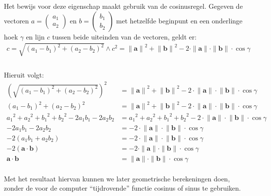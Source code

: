 \documentclass[12pt,a4paper]{article}
\begin{document}
	Het bewijs voor deze eigenschap maakt gebruik van de cosinusregel. Gegeven de vectoren $a=\begin{pmatrix} a_1 \\ a_2 \end{pmatrix}$ en $b=\begin{pmatrix} b_1 \\ b_2 \end{pmatrix}$ met hetzelfde beginpunt en een onderlinge hoek $\gamma$ en lijn $c$ tussen beide uiteinden van de vectoren, geldt er:
 	\begin{equation}
		\begin{aligned}
			c=\sqrt{(a_1-b_1)^2+(a_2-b_2)^2} \wedge c^2={\|\mathbf{a}\|}^2 + {\|\mathbf{b}\|}^2 - 2 \cdot \|\mathbf{a}\| \cdot \|\mathbf{b}\| \cdot \cos\gamma \\
		\end{aligned}
	\end{equation}
	\\Hieruit volgt:
	\begin{equation}
		\label{inproduct-cosinus}
		\begin{aligned}
			\left(\sqrt{(a_1-b_1)^2 + (a_2-b_2)^2}\right)^2 &= {\|\mathbf{a}\|}^2 + {\|\mathbf{b}\|}^2 - 2 \cdot {\|\mathbf{a}\|} \cdot {\|\mathbf{b}\|} \cdot \cos\gamma \\
			(a_1-b_1)^2 + (a_2-b_2)^2 &= {\|\mathbf{a}\|}^2 + {\|\mathbf{b}\|}^2 - 2 \cdot {\|\mathbf{a}\|} \cdot {\|\mathbf{b}\|} \cdot \cos\gamma \\
			{a_1}^2 + {a_2}^2+ {b_1}^2 + {b_2}^2 - 2a_1b_1 - 2a_2b_2 &= {a_1}^2 + {a_2}^2+ {b_1}^2 + {b_2}^2 - 2 \cdot {\|\mathbf{a}\|} \cdot {\|\mathbf{b}\|} \cdot \cos\gamma \\
			-2a_1b_1 - 2a_2b_2 &= - 2 \cdot {\|\mathbf{a}\|} \cdot {\|\mathbf{b}\|} \cdot \cos\gamma \\
			-2(a_1b_1 + a_2b_2) &= - 2 \cdot {\|\mathbf{a}\|} \cdot {\|\mathbf{b}\|} \cdot \cos\gamma \\
			-2(\mathbf{a} \cdot \mathbf{b}) &= - 2 \cdot \|\mathbf{a}\| \cdot \|\mathbf{b}\| \cdot \cos\gamma \\
			\mathbf{a} \cdot \mathbf{b} &= \|\mathbf{a}\| \cdot \|\mathbf{b}\| \cdot \cos\gamma\\
		\end{aligned}
	\end{equation}

	Met het resultaat hiervan kunnen we later geometrische berekeningen doen, zonder de voor de computer ``tijdrovende'' functie cosinus of sinus te gebruiken.
	
\end{document}
